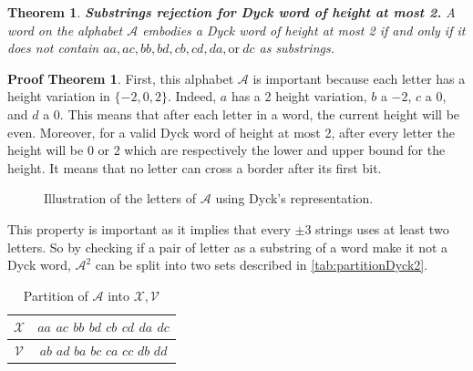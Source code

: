 \documentclass[11pt,a4paper]{article}
\theoremstyle{definition}
\theoremstyle{plain}
\newtheorem{theorem}{Theorem}[section]
\theoremstyle{definition}
\newtheorem{tproof}{Proof Theorem}[section]
\begin{document}
\begin{theorem}{\textbf{Substrings rejection for Dyck word of height at most 2.}}
    A word on the alphabet $\mathcal{A}$ embodies a Dyck word of
    height at most 2 if and only if it does not contain $aa, ac, bb, bd, cb, cd, da, \textrm{or}\ dc$
    as substrings.
\end{theorem}

\begin{tproof}
    First, this alphabet $\mathcal{A}$ is important because each letter has a height variation
    in $\{-2, 0, 2\}$. Indeed, $a$ has a 2 height variation, $b$ a $-2$, $c$ a 0, and $d$ a 0.
    This means that after each letter in a word, the current height will be even. Moreover,
    for a valid Dyck word of height at most 2, after every letter the height will be 0 or 2
    which are respectively the lower and upper bound for the height. It means that no letter
    can cross a border after its first bit.

    \begin{figure}[h!]
        \centering
        \caption{Illustration of the letters of $\mathcal{A}$ using Dyck's representation.}
        \label{tikz:dyck2alphabet}
    \end{figure}

    This property is important as it implies that every $\pm 3$ strings uses at least two letters.
    So by checking if a pair of letter as a substring of a word make it not a Dyck word, $\mathcal{A}^2$
    can be split into two sets described in \autoref{tab:partitionDyck2}.

    \begin{table}[htb]
        \centering
        \caption{Partition of $\mathcal{A}$ into $\mathcal{X}, \mathcal{V}$}
        \label{tab:partitionDyck2}
        \begin{tabular}{|c|c|}
            \hline
            $\mathcal{X}$ & $aa$ $ac$ $bb$ $bd$ $cb$ $cd$ $da$ $dc$ \\
            \hline
            $\mathcal{V}$ & $ab$ $ad$ $ba$ $bc$ $ca$ $cc$ $db$ $dd$ \\
            \hline
        \end{tabular}



\end{table}
\end{tproof}
\end{document}
